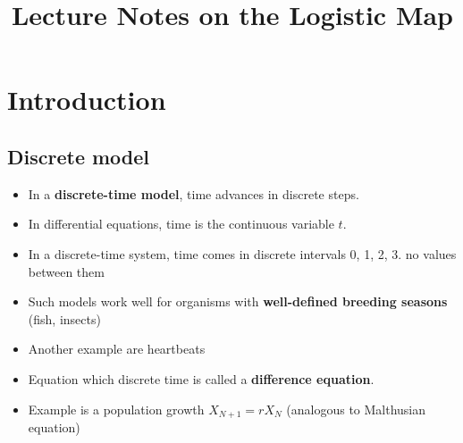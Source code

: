 \documentclass[12pt,a4paper]{article}
\title{Lecture Notes on the Logistic Map}
\date{}
\begin{document}
\maketitle

\section{Introduction}

\subsection{Discrete model}
\begin{itemize}
    \item In a \textbf{discrete-time model}, time advances in discrete steps. 
    \item In differential equations, time is the
continuous variable $t$.
\item In a discrete-time system, time comes in discrete intervals 0, 1, 2, 3.  no values between them
\item Such models work well for organisms with \textbf{well-defined breeding seasons} (fish, insects)
\item  Another example are heartbeats
\item Equation which discrete time is called a \textbf{difference equation}. 
\item Example is a population growth $X_{N+1} = rX_N$ (analogous to Malthusian equation)
\end{itemize}
\end{document}
